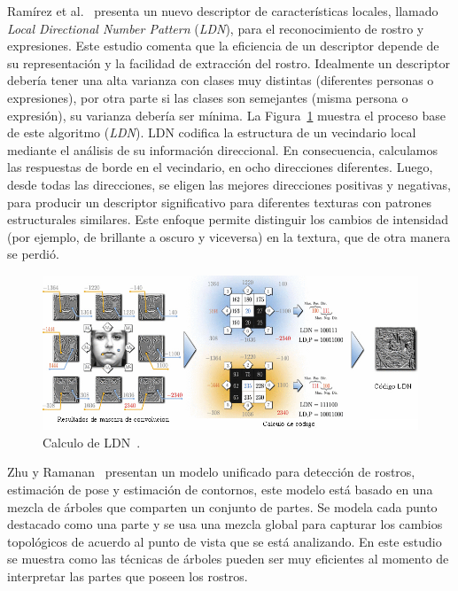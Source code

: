 Ramírez et al.~\cite{ldnp2013} presenta un nuevo descriptor de características locales, llamado \textit{Local Directional Number Pattern} (\textit{LDN}), para el reconocimiento de rostro y expresiones. Este estudio comenta que la eficiencia de un descriptor depende de su representación y la facilidad de extracción del rostro. Idealmente un descriptor debería tener una alta varianza con clases muy distintas (diferentes personas o expresiones), por otra parte si las clases son semejantes (misma persona o expresión), su varianza debería ser mínima. La Figura~\ref{fig:ldn} muestra el proceso base de este algoritmo (\textit{LDN}). LDN codifica la estructura de un vecindario local mediante el análisis de su información direccional. En consecuencia, calculamos las respuestas de borde en el vecindario, en ocho direcciones diferentes. Luego, desde todas las direcciones, se eligen las mejores direcciones positivas y negativas, para producir un descriptor significativo para diferentes texturas con patrones estructurales similares. Este enfoque permite distinguir los cambios de intensidad (por ejemplo, de brillante a oscuro y viceversa) en la textura, que de otra manera se perdió.

\begin{figure}[tb]
  \centering
   \includegraphics[width=1\textwidth]{Figuras/ldn.jpg}
   \caption{Calculo de LDN~\cite{ldnp2013}.}
   \label{fig:ldn}
\end{figure}

Zhu y Ramanan~\cite{Zhu2012} presentan un modelo unificado para detección de rostros, estimación de pose y estimación de contornos, este modelo está basado en una mezcla de árboles que comparten un conjunto de partes. Se modela cada punto destacado como una parte y se usa una mezcla global para capturar los cambios topológicos de acuerdo al punto de vista que se está analizando. En este estudio se muestra como las técnicas de árboles pueden ser muy eficientes al momento de interpretar las partes que poseen los rostros.

